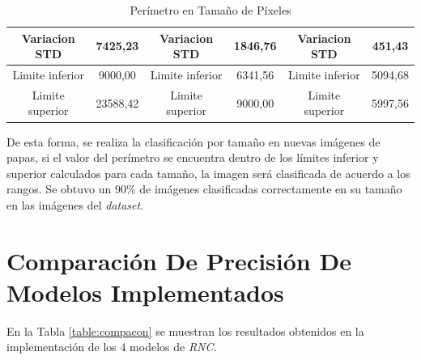\begin{table}[ht]
{\begin{tabular}{cccccc}
		\multicolumn{1}{|c|}{Variacion STD}     & \multicolumn{1}{c|}{7425,23}          & \multicolumn{1}{c|}{Variacion STD}     & \multicolumn{1}{c|}{1846,76}          & \multicolumn{1}{c|}{Variacion STD}     & \multicolumn{1}{c|}{451,43}          \\ \hline
		\multicolumn{1}{|c|}{Limite inferior}   & \multicolumn{1}{c|}{9000,00}              & \multicolumn{1}{c|}{Limite inferior}   & \multicolumn{1}{c|}{6341,56}              & \multicolumn{1}{c|}{Limite inferior}   & \multicolumn{1}{c|}{5094,68}              \\ \hline
		\multicolumn{1}{|c|}{Limite superior}   & \multicolumn{1}{c|}{23588,42}             & \multicolumn{1}{c|}{Limite superior}   & \multicolumn{1}{c|}{9000,00}              & \multicolumn{1}{c|}{Limite superior}   & \multicolumn{1}{c|}{5997,56}              \\ \hline                           
	\end{tabular}
	}
	\caption{Perímetro en Tamaño de Píxeles}
	\label{table:perimetro}
\end{table}

De esta forma, se realiza la clasificación por tamaño en nuevas imágenes de papas, si el valor del perímetro se encuentra dentro de los límites inferior y superior calculados para cada tamaño, la imagen será clasificada de acuerdo a los rangos. Se obtuvo un $90\%$ de imágenes clasificadas correctamente en su tamaño en las imágenes del \textit{dataset}.

\section{Comparación De Precisión De Modelos Implementados}

En la Tabla \ref{table:compacon} se muestran los resultados obtenidos en la implementación de los $4$ modelos de \textit{RNC}.

